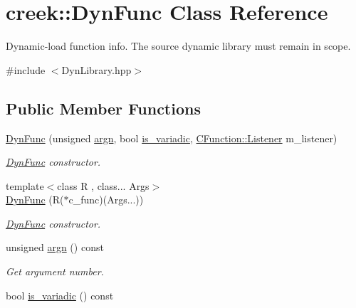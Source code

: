 \hypertarget{classcreek_1_1_dyn_func}{}\section{creek\+:\+:Dyn\+Func Class Reference}
\label{classcreek_1_1_dyn_func}


Dynamic-\/load function info. The source dynamic library must remain in scope.  




{\ttfamily \#include $<$Dyn\+Library.\+hpp$>$}

\subsection*{Public Member Functions}
\begin{DoxyCompactItemize}
\item 
\hyperlink{classcreek_1_1_dyn_func_a15e8792a199ee16e18500c3b3d8ae125}{Dyn\+Func} (unsigned \hyperlink{classcreek_1_1_dyn_func_aec8581b0d7363f351f637174a84953a5}{argn}, bool \hyperlink{classcreek_1_1_dyn_func_a73c32296f4318eba445112b5f1a4a52c}{is\+\_\+variadic}, \hyperlink{classcreek_1_1_c_function_a9499b5501ecc59d9ef8d892991c8fa16}{C\+Function\+::\+Listener} m\+\_\+listener)
\begin{DoxyCompactList}\small\item\em {\ttfamily \hyperlink{classcreek_1_1_dyn_func}{Dyn\+Func}} constructor. \end{DoxyCompactList}\item 
{\footnotesize template$<$class R , class... Args$>$ }\\\hyperlink{classcreek_1_1_dyn_func_ab6510c72e0d8af8d24d6353cbe15482c}{Dyn\+Func} (R($\ast$c\+\_\+func)(Args...))
\begin{DoxyCompactList}\small\item\em {\ttfamily \hyperlink{classcreek_1_1_dyn_func}{Dyn\+Func}} constructor. \end{DoxyCompactList}\item 
unsigned \hyperlink{classcreek_1_1_dyn_func_aec8581b0d7363f351f637174a84953a5}{argn} () const \hypertarget{classcreek_1_1_dyn_func_aec8581b0d7363f351f637174a84953a5}{}\label{classcreek_1_1_dyn_func_aec8581b0d7363f351f637174a84953a5}

\begin{DoxyCompactList}\small\item\em Get argument number. \end{DoxyCompactList}\item 
bool \hyperlink{classcreek_1_1_dyn_func_a73c32296f4318eba445112b5f1a4a52c}{is\+\_\+variadic} () const \hypertarget{classcreek_1_1_dyn_func_a73c32296f4318eba445112b5f1a4a52c}{}\label{classcreek_1_1_dyn_func_a73c32296f4318eba445112b5f1a4a52c}


\end{DoxyCompactItemize}
